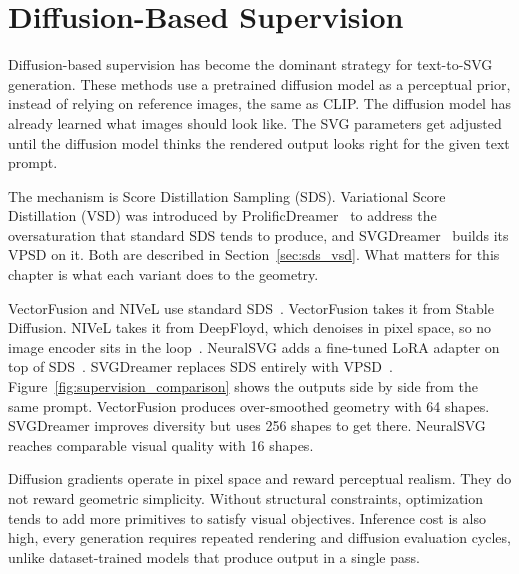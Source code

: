 \section{Diffusion-Based Supervision}
\label{sec:diffusion_supervision}

Diffusion-based supervision has become the dominant strategy for text-to-SVG generation. 
These methods use a pretrained diffusion model as a perceptual prior, instead of relying on reference images, the same as CLIP. 
The diffusion model has already learned what images should look like. 
The SVG parameters get adjusted until the diffusion model thinks the rendered output looks right for the given text prompt.

The mechanism is Score Distillation Sampling (SDS). Variational Score Distillation (VSD) 
was introduced by ProlificDreamer~\cite{wangProlificDreamerHighFidelityDiverse2023} to address the oversaturation 
that standard SDS tends to produce, and SVGDreamer~\cite{xingSVGDreamerTextGuided2024} builds its VPSD on it. 
Both are described in Section~\ref{sec:sds_vsd}. 
What matters for this chapter is what each variant does to the geometry.

VectorFusion and NIVeL use standard SDS~\cite{jainVectorFusionTexttoSVGAbstracting2022, thamizharasanNIVeLNeuralImplicit2024}. 
VectorFusion takes it from Stable Diffusion. NIVeL takes it from DeepFloyd, which denoises in pixel space, so no image encoder sits in the loop~\cite{thamizharasanNIVeLNeuralImplicit2024}. 
NeuralSVG adds a fine-tuned LoRA adapter on top of SDS~\cite{polaczekNeuralSVGImplicitRepresentation2025}. 
SVGDreamer replaces SDS entirely with VPSD~\cite{xingSVGDreamerTextGuided2024}. 
Figure~\ref{fig:supervision_comparison} shows the outputs side by side from the same prompt. 
VectorFusion produces over-smoothed geometry with 64 shapes. 
SVGDreamer improves diversity but uses 256 shapes to get there. 
NeuralSVG reaches comparable visual quality with 16 shapes. 

Diffusion gradients operate in pixel space and reward perceptual realism. 
They do not reward geometric simplicity. Without structural constraints, 
optimization tends to add more primitives to satisfy visual objectives.
Inference cost is also high, every generation requires repeated rendering and 
diffusion evaluation cycles, unlike dataset-trained models that produce output in a single pass.


